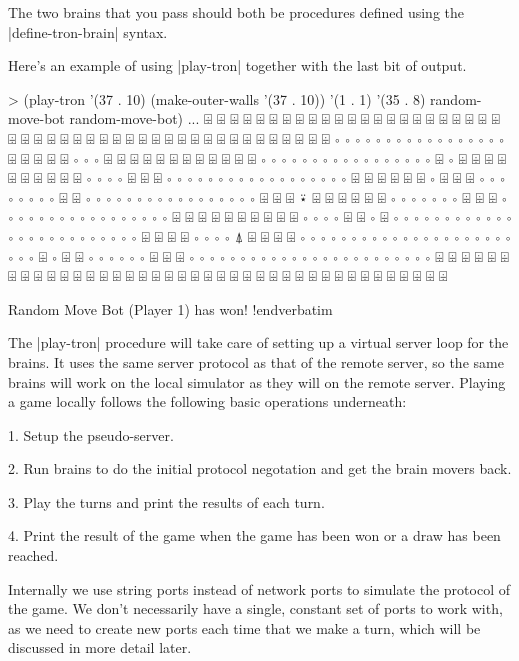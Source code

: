 The two brains that you pass should both be procedures defined using the 
|define-tron-brain| syntax. 

\noindent Here's an example of using |play-tron| together with the last bit of 
output.

\medskip\verbatim
> (play-tron '(37 . 10) (make-outer-walls '(37 . 10)) '(1 . 1) '(35 . 8) random-move-bot random-move-bot)
...
⌹ ⌹ ⌹ ⌹ ⌹ ⌹ ⌹ ⌹ ⌹ ⌹ ⌹ ⌹ ⌹ ⌹ ⌹ ⌹ ⌹ ⌹ ⌹ ⌹ ⌹ ⌹ ⌹ ⌹ ⌹ ⌹ ⌹ ⌹ ⌹ ⌹ ⌹ ⌹ ⌹ ⌹ ⌹ ⌹ ⌹ 
⌹ ⌹ ⌹ ⌹ ⌹ ⌹ ⌹ ⌹ ⌹ ⌹ ⌹ ∘ ∘ ∘ ∘ ∘ ∘ ∘ ∘ ∘ ∘ ∘ ∘ ∘ ∘ ∘ ∘ ∘ ⌹ ⌹ ⌹ ⌹ ⌹ ∘ ∘ ∘ ⌹ 
⌹ ⌹ ⌹ ⌹ ⌹ ⌹ ⌹ ⌹ ⌹ ⌹ ⌹ ∘ ∘ ∘ ∘ ∘ ∘ ∘ ∘ ∘ ∘ ∘ ∘ ∘ ∘ ∘ ∘ ∘ ⌹ ∘ ⌹ ⌹ ⌹ ⌹ ⌹ ⌹ ⌹ 
⌹ ⌹ ⌹ ∘ ∘ ∘ ∘ ⌹ ⌹ ⌹ ∘ ∘ ∘ ∘ ∘ ∘ ∘ ∘ ∘ ∘ ∘ ∘ ∘ ∘ ∘ ∘ ∘ ∘ ⌹ ⌹ ⌹ ⌹ ⌹ ⌹ ∘ ⌹ ⌹ 
⌹ ∘ ∘ ∘ ∘ ∘ ∘ ∘ ∘ ⌹ ⌹ ∘ ∘ ∘ ∘ ∘ ∘ ∘ ∘ ∘ ∘ ∘ ∘ ∘ ∘ ∘ ∘ ∘ ⌹ ⌹ ⌹ ⍣ ⌹ ⌹ ⌹ ⌹ ⌹ 
⌹ ∘ ∘ ∘ ∘ ∘ ∘ ∘ ⌹ ⌹ ⌹ ∘ ∘ ∘ ∘ ∘ ∘ ∘ ∘ ∘ ∘ ∘ ∘ ∘ ∘ ∘ ∘ ∘ ⌹ ⌹ ⌹ ⌹ ⌹ ⌹ ⌹ ⌹ ⌹ 
⌹ ∘ ∘ ∘ ∘ ⌹ ⌹ ∘ ⌹ ∘ ∘ ∘ ∘ ∘ ∘ ∘ ∘ ∘ ∘ ∘ ∘ ∘ ∘ ∘ ∘ ∘ ∘ ∘ ∘ ∘ ∘ ∘ ∘ ∘ ⌹ ⌹ ⌹ 
⌹ ∘ ∘ ∘ ∘ ⍋ ⌹ ⌹ ⌹ ⌹ ∘ ∘ ∘ ∘ ∘ ∘ ∘ ∘ ∘ ∘ ∘ ∘ ∘ ∘ ∘ ∘ ∘ ∘ ∘ ∘ ∘ ∘ ∘ ∘ ⌹ ∘ ⌹ 
⌹ ∘ ∘ ∘ ∘ ∘ ∘ ⌹ ⌹ ⌹ ∘ ∘ ∘ ∘ ∘ ∘ ∘ ∘ ∘ ∘ ∘ ∘ ∘ ∘ ∘ ∘ ∘ ∘ ∘ ∘ ∘ ∘ ∘ ∘ ⌹ ⌹ ⌹ 
⌹ ⌹ ⌹ ⌹ ⌹ ⌹ ⌹ ⌹ ⌹ ⌹ ⌹ ⌹ ⌹ ⌹ ⌹ ⌹ ⌹ ⌹ ⌹ ⌹ ⌹ ⌹ ⌹ ⌹ ⌹ ⌹ ⌹ ⌹ ⌹ ⌹ ⌹ ⌹ ⌹ ⌹ ⌹ ⌹ ⌹ 

Random Move Bot (Player 1) has won!
!endverbatim\medskip


The |play-tron| procedure will take care of setting up a virtual 
server loop for the brains. It uses the same server protocol as that of the 
remote server, so the same brains will work on the local simulator as they 
will on the remote server. Playing a game locally follows the following 
basic operations underneath:

{\medskip\narrower
\item{1.} Setup the pseudo-server.
\item{2.} Run brains to do the initial protocol negotation 
          and get the brain movers back.
\item{3.} Play the turns and print the results of each turn.
\item{4.} Print the result of the game when the game has been won or a draw 
          has been reached.
\par\medskip}

\noindent Internally we use string ports instead of network ports to simulate 
the protocol of the game. We don't necessarily have a single, constant set of 
ports to work with, as we need to create new ports each time that we make a 
turn, which will be discussed in more detail later.


